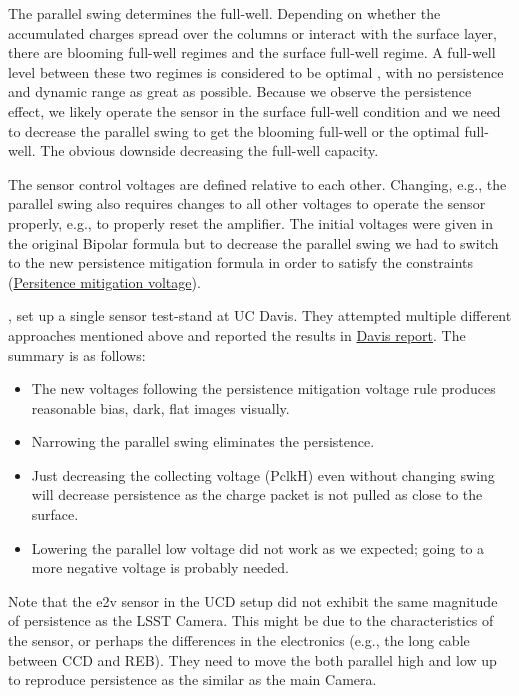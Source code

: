 The parallel swing determines the full-well. Depending on whether the
accumulated charges spread over the columns or interact with the surface
layer, there are blooming full-well regimes and the surface full-well
regime. A full-well level between these two regimes is considered to be
optimal \citep{2001sccd.book.....J}, with no persistence and dynamic range as great as
possible. Because we observe the persistence effect, we likely operate the sensor in the
surface full-well condition and we need to decrease the parallel swing to
get the blooming full-well or the optimal full-well. The obvious downside
decreasing the full-well capacity.

The sensor control voltages are defined relative to each other. Changing, e.g., the parallel
swing also requires changes to all other voltages to
operate the sensor properly, e.g., to properly reset the amplifier.
The initial voltages were given in the original Bipolar formula
 but to decrease the parallel swing we had
to switch to the new persistence mitigation formula in order to satisfy the constraints (\href{https://github.com/lsst-camera-dh/e2v_voltages/blob/main/setup_e2v_v4.py}{Persitence mitigation voltage}).

\citet{2024SPIE13103E..21S}, set up a single sensor test-stand at UC
Davis. They attempted multiple different approaches mentioned above and
reported the results in \href{https://docs.google.com/document/d/1V4o9tzKBLnI1nlOlMFImPko8pDkD6qE7jzzk-duE-Qo/edit?tab=t.0\#heading=h.frkqtvvyydkr}{Davis report}. 
The summary is as follows:

\begin{itemize}
\tightlist
\item
  The new voltages following the persistence mitigation voltage rule produces reasonable bias, dark, flat images visually.
\item
  Narrowing the parallel swing eliminates the persistence.
\item Just decreasing the collecting voltage (PclkH) even without changing swing will decrease persistence as the charge packet is not pulled as close to the surface. 
\item
  Lowering the parallel low voltage did not work
  as we expected; going to a more negative voltage is probably needed.
  \end{itemize}

Note that the e2v sensor in the UCD setup did not exhibit the same magnitude of persistence as the LSST Camera.
This might be due to the characteristics of the sensor, or perhaps
the differences in the electronics (e.g., the long cable between CCD and REB). They need to move the both parallel high and low up to reproduce persistence as the similar as the main Camera.

